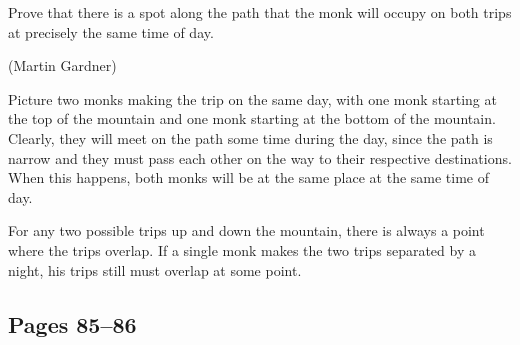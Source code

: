 \documentclass[letterpaper, landscape]{exam}
\begin{document}
\begin{questions}
      Prove that there is a spot along the path that the monk will occupy on both trips at precisely the same time of day.

      (Martin Gardner)

      \begin{solution}
        Picture two monks making the trip on the same day, with one monk starting at the top of the mountain and one monk
        starting at the bottom of the mountain.  Clearly, they will meet on the path some time during the day, since the
        path is narrow and they must pass each other on the way to their respective destinations.  When this happens, both
        monks will be at the same place at the same time of day.  

        For any two possible trips up and down the mountain, there is always a point where the trips overlap.  If a
        single monk makes the two trips separated by a night, his trips still must overlap at some point.

      \end{solution}

  \end{questions}

  \ifprintanswers{}

    \subsection{Pages 85--86} 
\end{document}
